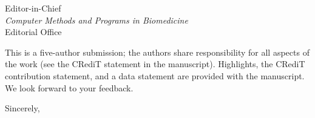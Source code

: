 \documentclass[11pt,letterpaper]{letter}
\begin{document}
\begin{letter}{Editor-in-Chief\\
\emph{Computer Methods and Programs in Biomedicine}\\
Editorial Office}
\bigskip

This is a five-author submission; the authors share responsibility for all
aspects of the work (see the CRediT statement in the manuscript).
Highlights, the CRediT contribution statement, and a data statement are
provided with the manuscript. We look
forward to your feedback.

\closing{Sincerely,}

\end{letter}
\end{document}
